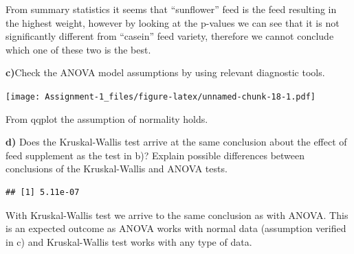 \documentclass[
]{article}
\newenvironment{Shaded}{\begin{snugshade}}{\end{snugshade}}
\newcommand{\AttributeTok}[1]{\textcolor[rgb]{0.77,0.63,0.00}{#1}}
\newcommand{\CommentTok}[1]{\textcolor[rgb]{0.56,0.35,0.01}{\textit{#1}}}
\newcommand{\FunctionTok}[1]{\textcolor[rgb]{0.00,0.00,0.00}{#1}}
\newcommand{\NormalTok}[1]{#1}
\newcommand{\SpecialCharTok}[1]{\textcolor[rgb]{0.00,0.00,0.00}{#1}}
\begin{document}
From summary statistics it seems that ``sunflower'' feed is the feed
resulting in the highest weight, however by looking at the p-values we
can see that it is not significantly different from ``casein'' feed
variety, therefore we cannot conclude which one of these two is the
best.

\textbf{c)}Check the ANOVA model assumptions by using relevant
diagnostic tools.

\begin{Shaded}
\end{Shaded}

\texttt{[image: Assignment-1\_files/figure-latex/unnamed-chunk-18-1.pdf]}

From qqplot the assumption of normality holds.

\textbf{d)} Does the Kruskal-Wallis test arrive at the same conclusion
about the effect of feed supplement as the test in b)? Explain possible
differences between conclusions of the Kruskal-Wallis and ANOVA tests.

\begin{Shaded}
\end{Shaded}

\begin{verbatim}
## [1] 5.11e-07
\end{verbatim}

With Kruskal-Wallis test we arrive to the same conclusion as with ANOVA.
This is an expected outcome as ANOVA works with normal data (assumption
verified in c) and Kruskal-Wallis test works with any type of data.
\end{document}
